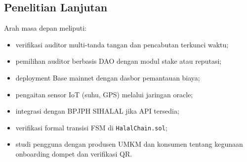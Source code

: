\subsection{Penelitian Lanjutan}
Arah masa depan meliputi:
\begin{itemize}
  \item verifikasi auditor multi-tanda tangan dan pencabutan terkunci waktu;
  \item pemilihan auditor berbasis DAO dengan modul stake atau reputasi;
  \item deployment Base mainnet dengan dasbor pemantauan biaya;
  \item pengaitan sensor IoT (suhu, GPS) melalui jaringan oracle;
  \item integrasi dengan BPJPH SIHALAL jika API tersedia;
  \item verifikasi formal transisi FSM di \texttt{HalalChain.sol};
  \item studi pengguna dengan produsen UMKM dan konsumen tentang kegunaan onboarding dompet dan verifikasi QR.
\end{itemize}
